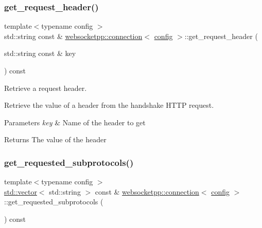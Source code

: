 \subsubsection{\texorpdfstring{get\+\_\+request\+\_\+header()}{get\_request\_header()}}
{\footnotesize\ttfamily template$<$typename config $>$ \\
std\+::string const  \& \mbox{\hyperlink{classwebsocketpp_1_1connection}{websocketpp\+::connection}}$<$ \mbox{\hyperlink{classconfig}{config}} $>$\+::get\+\_\+request\+\_\+header (\begin{DoxyParamCaption}\item[{std\+::string const \&}]{key }\end{DoxyParamCaption}) const}



Retrieve a request header. 

Retrieve the value of a header from the handshake H\+T\+TP request.


\begin{DoxyParams}{Parameters}
{\em key} & Name of the header to get \\
\hline
\end{DoxyParams}
\begin{DoxyReturn}{Returns}
The value of the header 
\end{DoxyReturn}
\mbox{\label{classwebsocketpp_1_1connection_ae0f196cb11d4a38ef59f2173424a4d51}} 
\subsubsection{\texorpdfstring{get\+\_\+requested\+\_\+subprotocols()}{get\_requested\_subprotocols()}}
{\footnotesize\ttfamily template$<$typename config $>$ \\
\mbox{\hyperlink{classstd_1_1vector}{std\+::vector}}$<$ std\+::string $>$ const  \& \mbox{\hyperlink{classwebsocketpp_1_1connection}{websocketpp\+::connection}}$<$ \mbox{\hyperlink{classconfig}{config}} $>$\+::get\+\_\+requested\+\_\+subprotocols (\begin{DoxyParamCaption}{ }\end{DoxyParamCaption}) const}



